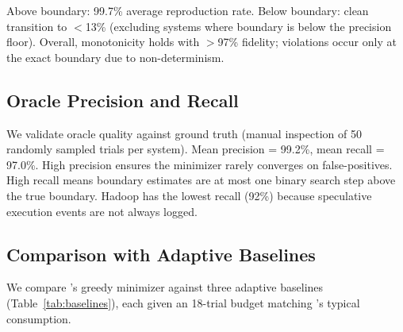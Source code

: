 Above boundary: 99.7\% average reproduction rate. Below boundary: clean
transition to $<$13\% (excluding systems where boundary is below the
precision floor). Overall, monotonicity holds with $>$97\% fidelity;
violations occur only at the exact boundary due to non-determinism.

\subsection{Oracle Precision and Recall}
\label{sec:oracle-eval}

We validate oracle quality against ground truth (manual inspection of 50
randomly sampled trials per system). Mean precision = 99.2\%, mean recall =
97.0\%. High precision ensures the minimizer rarely converges on
false-positives. High recall means boundary estimates are at most one binary
search step above the true boundary. Hadoop has the lowest recall (92\%)
because speculative execution events are not always logged.

\subsection{Comparison with Adaptive Baselines}
\label{sec:baselines-eval}

We compare \system{}'s greedy minimizer against three adaptive baselines
(Table~\ref{tab:baselines}), each given an 18-trial budget matching
\system{}'s typical consumption.

